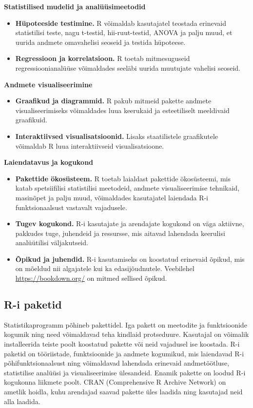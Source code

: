 \documentclass[
]{book}
\providecommand{\tightlist}{%
  \setlength{\itemsep}{0pt}\setlength{\parskip}{0pt}}
\begin{document}
\textbf{Statistilised mudelid ja analüüsimeetodid}

\begin{itemize}
\tightlist
\item
  \textbf{Hüpoteeside testimine.} R võimaldab kasutajatel teostada erinevaid statistilisi teste, nagu t-testid, hii-ruut-testid, ANOVA ja palju muud, et uurida andmete omavahelisi seoseid ja testida hüpoteese.
\item
  \textbf{Regressioon ja korrelatsioon.} R toetab mitmesuguseid regressioonianalüüse võimaldades seeläbi uurida muutujate vahelisi seoseid.
\end{itemize}

\textbf{Andmete visualiseerimine}

\begin{itemize}
\tightlist
\item
  \textbf{Graafikud ja diagrammid.} R pakub mitmeid pakette andmete visualiseerimiseks võimaldades luua keerukaid ja esteetiliselt meeldivaid graafikuid.
\item
  \textbf{Interaktiivsed visualisatsioonid.} Lisaks staatilistele graafikutele võimaldab R luua interaktiivseid visualisatsioone.
\end{itemize}

\textbf{Laiendatavus ja kogukond}

\begin{itemize}
\tightlist
\item
  \textbf{Pakettide ökosüsteem.} R toetab laialdast pakettide ökosüsteemi, mis katab spetsiifilisi statistilisi meetodeid, andmete visualiseerimise tehnikaid, masinõpet ja palju muud, võimaldades kasutajatel laiendada R-i funktsionaalsust vastavalt vajadusele.
\item
  \textbf{Tugev kogukond.} R-i kasutajate ja arendajate kogukond on väga aktiivne, pakkudes tuge, juhendeid ja ressursse, mis aitavad lahendada keerulisi analüütilisi väljakutseid.
\item
  \textbf{Õpikud ja juhendid.} R-i kasutamiseks on koostatud erinevaid õpikud, mis on mõeldud nii algajatele kui ka edasijõudnutele. Veebilehel \url{https://bookdown.org/} on mitmed sellised õpikud.
\end{itemize}

\subsection{R-i paketid}\label{r-i-paketid}

Statistikaprogramm põhineb pakettidel. Iga pakett on meetodite ja funktsioonide kogumik ning need võimaldavad teha kindlaid protseduure. Kasutajal on võimalik installeerida teiste poolt koostatud pakette või neid vajadusel ise koostada. R-i paketid on tööriistade, funktsioonide ja andmete kogumikud, mis laiendavad R-i põhifunktsionaalsust ning võimaldavad lahendada erinevaid andmetöötluse, statistilise analüüsi ja visualiseerimise ülesandeid. Enamik pakette on loodud R-i kogukonna liikmete poolt. CRAN (Comprehensive R Archive Network) on ametlik hoidla, kuhu arendajad saavad pakette üles laadida ning kasutajad neid alla laadida.
\end{document}
